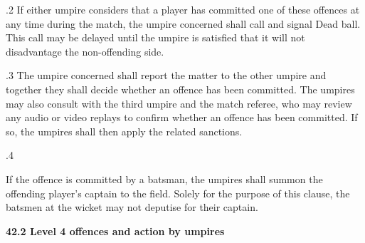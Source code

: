 \documentclass[12pt]{article}
\begin{document}
\vspace{\baselineskip}
\begin{adjustwidth}{0.5in}{0.15in}
\begin{justify}
{\fontsize{9pt}{10.8pt}.2 \tabto{0.49in} If either umpire considers that a player has committed one of these offences at any time during the match, the umpire concerned shall call and signal Dead ball. This call may be delayed until the umpire is satisfied that it will not disadvantage the non-offending side.\par}
\end{justify}\par

\end{adjustwidth}


\vspace{\baselineskip}
\begin{adjustwidth}{0.5in}{0.07in}
{\fontsize{9pt}{10.8pt}.3 \tabto{0.49in} The umpire concerned shall report the matter to the other umpire and together they shall decide whether an offence has been committed. The umpires may also consult with the third umpire and the match referee, who may review any audio or video replays to confirm whether an offence has been committed. If so, the umpires shall then apply the related sanctions.\par}\par

\end{adjustwidth}


\vspace{\baselineskip}
\begin{adjustwidth}{0.5in}{0.22in}
{\fontsize{9pt}{10.8pt}.4 \tabto{0.49in} {\fontsize{8pt}{9.6pt}\selectfont If the offence is committed by a batsman, the umpires shall summon the offending player’s captain to the field. Solely for the purpose of this clause, the batsmen at the wicket may not deputise for their captain.\par}\par}\par

\end{adjustwidth}


\vspace{\baselineskip}
{\fontsize{11pt}{13.2pt}\selectfont \textbf{42.2 \tabto{0.47in} Level 4 offences and action by umpires}\par}\par
\end{document}
